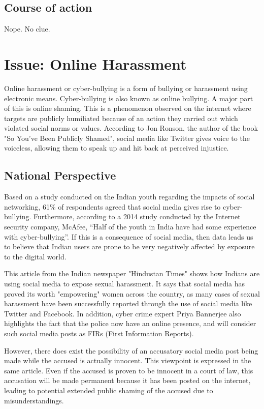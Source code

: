 \documentclass[a4paper, 11pt]{article}
\begin{document}
  \subsection{Course of action}
    Nope. No clue.

\section{Issue: Online Harassment}

  Online harassment or cyber-bullying is a form of bullying or harassment using electronic means. Cyber-bullying is also known as online bullying. A major part of this is online shaming. This is a phenomenon observed on the internet where targets are publicly humiliated because of an action they carried out which violated social norms or values. According to Jon Ronson, the author of the book "So You've Been Publicly Shamed", social media like Twitter gives voice to the voiceless, allowing them to speak up and hit back at perceived injustice. \cite{jon-ronson-book, jon-ronson-ted-talk}

  \subsection{National Perspective}

    Based on a study conducted on the Indian youth regarding the impacts of social networking, 61\% of respondents agreed that social media gives rise to cyber-bullying.\cite{indian-youth-study} Furthermore, according to a 2014 study conducted by the Internet security company, McAfee, “Half of the youth in India have had some experience with cyber-bullying”.
    If this is a consequence of social media, then data leads us to believe that Indian users are prone to be very negatively affected by exposure to the digital world.

    This article from the Indian newspaper "Hindustan Times" shows how Indians are using social media to expose sexual harassment.\cite{hindustan-times-shaming} It says that social media has proved its worth "empowering" women across the country, as many cases of sexual harassment have been successfully reported through the use of social media like Twitter and Facebook. In addition, cyber crime expert Priya Bannerjee also highlights the fact that the police now have an online presence, and will consider such social media posts as FIRs (First Information Reports).

    However, there does exist the possibility of an accusatory social media post being made while the accused is actually innocent. This viewpoint is expressed in the same article. \cite{hindustan-times-shaming} Even if the accused is proven to be innocent in a court of law, this accusation will be made permanent because it has been posted on the internet, leading to potential extended public shaming of the accused due to misunderstandings.
\end{document}
